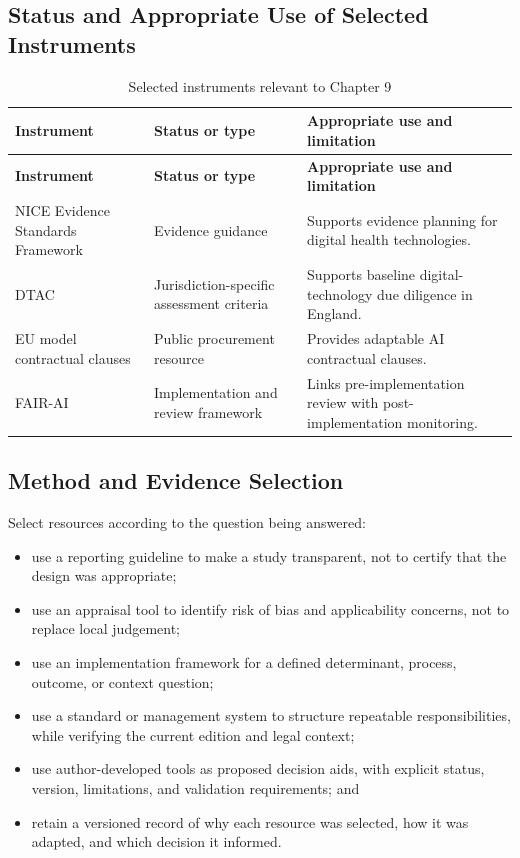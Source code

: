 \subsection{Status and Appropriate Use of Selected Instruments}
\begin{longtable}{@{}p{}p{}p{}@{}}
\caption{Selected instruments relevant to Chapter 9}
\label{tab:comp-ch09-instrument-status}\\
\toprule
\textbf{Instrument} & \textbf{Status or type} & \textbf{Appropriate use and limitation} \\
\midrule
\endfirsthead
\toprule
\textbf{Instrument} & \textbf{Status or type} & \textbf{Appropriate use and limitation} \\
\midrule
\endhead
\bottomrule
\endlastfoot
NICE Evidence Standards Framework & Evidence guidance & Supports evidence planning for digital health technologies. \\
DTAC & Jurisdiction-specific assessment criteria & Supports baseline digital-technology due diligence in England. \\
EU model contractual clauses & Public procurement resource & Provides adaptable AI contractual clauses. \\
FAIR-AI & Implementation and review framework & Links pre-implementation review with post-implementation monitoring. \\
\end{longtable}

\subsection{Method and Evidence Selection}
Select resources according to the question being answered:
\begin{itemize}
 \item use a reporting guideline to make a study transparent, not to certify that the design was appropriate;
 \item use an appraisal tool to identify risk of bias and applicability concerns, not to replace local judgement;
 \item use an implementation framework for a defined determinant, process, outcome, or context question;
 \item use a standard or management system to structure repeatable responsibilities, while verifying the current edition and legal context;
 \item use author-developed tools as proposed decision aids, with explicit status, version, limitations, and validation requirements; and
 \item retain a versioned record of why each resource was selected, how it was adapted, and which decision it informed.
\end{itemize}

